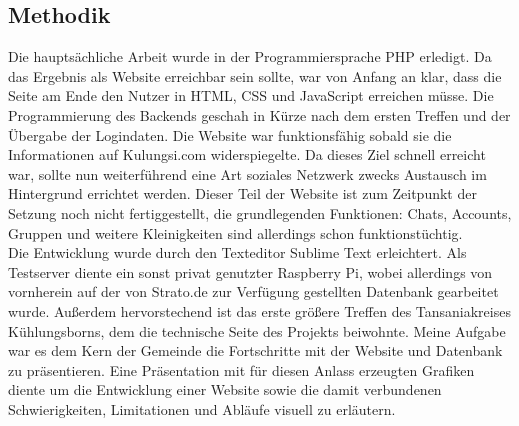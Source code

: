 \subsection{Methodik} %
Die hauptsächliche Arbeit wurde in der Programmiersprache PHP erledigt.
Da das Ergebnis als Website erreichbar sein sollte,
war von Anfang an klar, dass die Seite am Ende den Nutzer in HTML, CSS und JavaScript
erreichen müsse.
Die Programmierung des Backends geschah in Kürze nach dem ersten Treffen und der Übergabe der Logindaten.
Die Website war funktionsfähig sobald sie die Informationen auf Kulungsi.com widerspiegelte.
Da dieses Ziel schnell erreicht war, sollte nun weiterführend eine Art soziales Netzwerk zwecks Austausch im Hintergrund errichtet werden.
Dieser Teil der Website ist zum Zeitpunkt der Setzung noch nicht fertiggestellt, die grundlegenden
Funktionen: Chats, Accounts, Gruppen und weitere Kleinigkeiten sind allerdings schon funktionstüchtig.\\
Die Entwicklung wurde durch den Texteditor Sublime Text erleichtert.
Als Testserver diente ein sonst privat genutzter Raspberry Pi,
wobei allerdings von vornherein auf der von Strato.de zur Verfügung gestellten Datenbank gearbeitet wurde.
Außerdem hervorstechend ist das erste größere Treffen des Tansaniakreises Kühlungsborns,
dem die technische Seite des Projekts beiwohnte.
Meine Aufgabe war es dem Kern der Gemeinde die Fortschritte mit der Website und Datenbank zu präsentieren.
Eine Präsentation mit für diesen Anlass erzeugten Grafiken diente um die Entwicklung einer Website
sowie die damit verbundenen Schwierigkeiten, Limitationen und Abläufe visuell zu erläutern.

